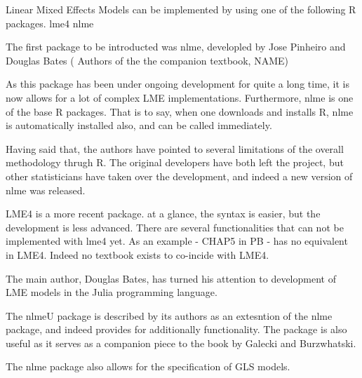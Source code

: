 	Linear Mixed Effects Models can be implemented by using one of the following R packages.
	lme4
	nlme
	
	The first package to be introducted was nlme, developled by Jose Pinheiro and Douglas Bates ( Authors of the the companion textbook, NAME)
	
	As this package has been under ongoing development for quite a long time, it is now allows for a lot of complex LME implementations. 
	Furthermore, nlme is one of the base R packages.  That is to say, when one downloads and installs R, nlme is automatically installed also, and can be called immediately.
	
	Having said that, the authors have pointed to several limitations of the overall methodology thrugh R.
	The original developers have both left the project, but other statisticians have taken over the development, and indeed a new version of nlme was released.
	
	LME4 is a more recent package. at a glance, the syntax is easier, but the development is less advanced. There are several functionalities that can not be implemented with lme4 yet. 
	As an example - CHAP5 in PB - has no equivalent in LME4. Indeed no textbook exists to co-incide with LME4.
	
	The main author, Douglas Bates, has turned his attention to development of LME models in the Julia programming language.
	
	The nlmeU package is described by its authors as an extesntion of the nlme package, and indeed provides for additionally functionality. The package is also useful as it serves as a companion piece to the 
	book by Galecki and Burzwhatski.
	
	The nlme package also allows for the specification of GLS models.
	
